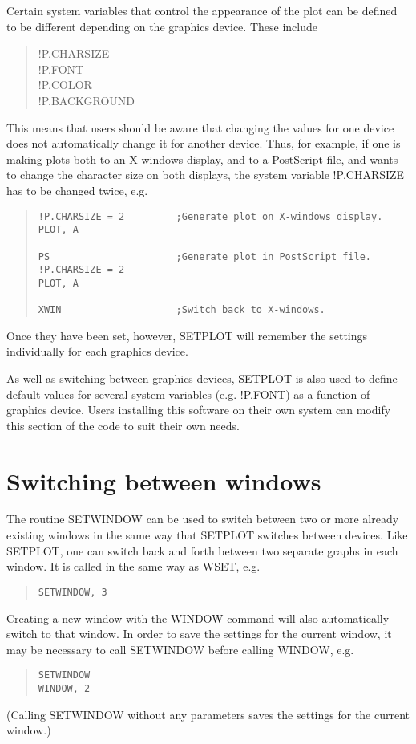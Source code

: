 Certain system variables that control the appearance of the plot can be defined
to be different depending on the graphics device.  These include
\begin{quote}
!P.CHARSIZE\\
!P.FONT\\
!P.COLOR\\
!P.BACKGROUND
\end{quote}
This means that users should be aware that changing the values for one device
does not automatically change it for another device.  Thus, for example, if one
is making plots both to an X-windows display, and to a PostScript file, and
wants to change the character size on both displays, the system variable
!P.CHARSIZE has to be changed twice, e.g.
\begin{quote}
\begin{verbatim}
!P.CHARSIZE = 2         ;Generate plot on X-windows display.
PLOT, A

PS                      ;Generate plot in PostScript file.
!P.CHARSIZE = 2
PLOT, A

XWIN                    ;Switch back to X-windows.
\end{verbatim}
\end{quote}
Once they have been set, however, SETPLOT will remember the settings
individually for each graphics device.

As well as switching between graphics devices, SETPLOT is also used to define
default values for several system variables (e.g. !P.FONT) as a function of
graphics device.  Users installing this software on their own system can modify
this section of the code to suit their own needs.

\section{Switching between windows}

The routine SETWINDOW can be used to switch between two or more already
existing windows in the same way that SETPLOT switches between devices.  Like
SETPLOT, one can switch back and forth between two separate graphs in each
window.  It is called in the same way as WSET, e.g.
\begin{quote}
\begin{verbatim}
SETWINDOW, 3
\end{verbatim}
\end{quote}

Creating a new window with the WINDOW command will also automatically switch to
that window.  In order to save the settings for the current window, it may be
necessary to call SETWINDOW before calling WINDOW, e.g.
\begin{quote}
\begin{verbatim}
SETWINDOW
WINDOW, 2
\end{verbatim}
\end{quote}
(Calling SETWINDOW without any parameters saves the settings for the current
window.)

